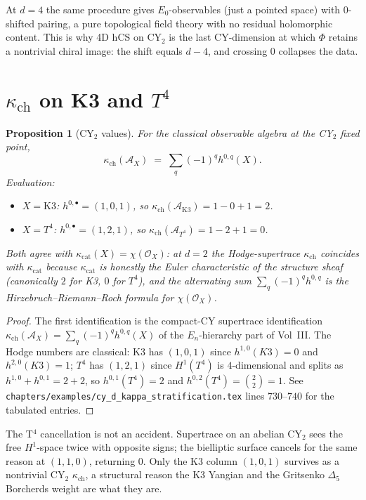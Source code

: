 \documentclass[11pt]{amsart}
\providecommand{\cA}{\mathcal{A}}
\providecommand{\cO}{\mathcal{O}}
\providecommand{\kappach}{\kappa_{\mathrm{ch}}}
\providecommand{\kappacat}{\kappa_{\mathrm{cat}}}
\theoremstyle{plain}
\newtheorem{proposition}[theorem]{Proposition}
\theoremstyle{definition}
\begin{document}
At $d=4$ the same procedure gives $E_0$-observables (just a pointed
space) with $0$-shifted pairing, a pure topological field theory
with no residual holomorphic content. This is why 4D hCS on CY$_2$
is the last CY-dimension at which $\Phi$ retains a nontrivial chiral
image: the shift equals $d-4$, and crossing $0$ collapses the data.

\section{$\kappach$ on K3 and $T^4$}

\begin{proposition}[CY$_2$ values]
\label{prop:kappa-ch-CY2}
For the classical observable algebra at the CY$_2$ fixed point,
\[
\kappach(\cA_X) \;=\; \sum_q (-1)^q h^{0,q}(X).
\]
Evaluation:
\begin{itemize}
\item $X = \mathrm{K3}$: $h^{0,\bullet} = (1,0,1)$, so
 $\kappach(\cA_{\mathrm{K3}}) = 1 - 0 + 1 = 2$.
\item $X = T^4$: $h^{0,\bullet} = (1,2,1)$, so
 $\kappach(\cA_{T^4}) = 1 - 2 + 1 = 0$.
\end{itemize}
Both agree with $\kappacat(X) = \chi(\cO_X)$: at $d=2$ the
Hodge-supertrace $\kappach$ coincides with $\kappacat$ because
$\kappacat$ is honestly the Euler characteristic of the structure
sheaf (canonically $2$ for K3, $0$ for $T^4$), and the alternating
sum $\sum_q (-1)^q h^{0,q}$ is the Hirzebruch--Riemann--Roch formula
for $\chi(\cO_X)$.
\end{proposition}

\begin{proof}
The first identification is the compact-CY supertrace identification
$\kappach(\cA_X) = \sum_q (-1)^q h^{0,q}(X)$ of the $E_n$-hierarchy
part of Vol~III. The Hodge numbers are classical: K3 has
$(1,0,1)$ since $h^{1,0}(K3)=0$ and $h^{2,0}(K3)=1$; $T^4$ has
$(1,2,1)$ since $H^1(T^4)$ is $4$-dimensional and splits as
$h^{1,0}+h^{0,1} = 2+2$, so $h^{0,1}(T^4) = 2$ and $h^{0,2}(T^4) =
\binom{2}{2} = 1$. See
\texttt{chapters/examples/cy\_d\_kappa\_stratification.tex}
lines $730$--$740$ for the tabulated entries.
\end{proof}

The T$^4$ cancellation is not an accident. Supertrace on an abelian
CY$_2$ sees the free $H^1$-space twice with opposite signs; the
bielliptic surface cancels for the same reason at
$(1,1,0)$, returning $0$. Only the K3 column $(1,0,1)$ survives
as a nontrivial CY$_2$ $\kappach$, a structural reason the K3 Yangian
and the Gritsenko $\Delta_5$ Borcherds weight are what they are.
\end{document}
